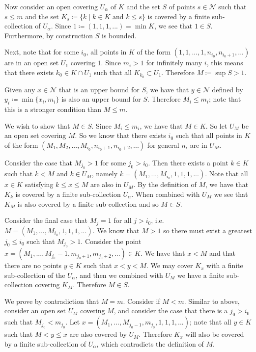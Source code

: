 Now consider an open covering \(U_\alpha\) of \(K\) and the set \(S\) of points \(s \in \mathcal N\) such
that \(s \leq m\) and the set \(K_s \coloneqq \{k \mid k \in K \text{ and } k \leq s\}\) is covered by a
finite sub-collection of \(U_\alpha\). Since \(1 \coloneqq (1, 1, 1, ...) = \min K\), we see that \(1 \in S\).
Furthermore, by construction \(S\) is bounded. 

Next, note that for some \(i_0\), all points in \(K\) of the form \((1, 1, ..., 1, n_{i_0}, n_{i_0 + 1}, ...)\)
are in an open set \(U_1\) covering \(1\). Since \(m_i > 1\) for infinitely many \(i\), this means that there
exists \(k_0 \in K \cap U_1\) such that all \(K_{k_0} \subset U_1\). Therefore \(M \coloneqq \sup S > 1\).

Given any \(x \in \mathcal N\) that is an upper bound for \(S\), we have that \(y \in \mathcal N\) defined by
\(y_i \coloneqq \min \{x_i, m_i\}\) is also an upper bound for \(S\). Therefore \(M_i \leq m_i\); note that
this is a stronger condition than \(M \leq m\). 

We wish to show that \(M \in S\). Since \(M_i \leq m_i\), we have that \(M \in K\). So let \(U_M\) be an
open set covering \(M\). So we know that there exists \(i_0\) such that all
points in \(K\) of the form \((M_1, M_2, ..., M_{i_0}, n_{i_0+1}, n_{i_0 + 2}, ...)\) for
general \(n_i\) are in \(U_M\).  

Consider the case that \(M_{j_0} > 1\) for some \(j_0 > i_0\). Then there exists a point \(k \in K\) such that
\(k < M\) and \(k \in U_M\), namely \(k = (M_1, ..., M_{i_0}, 1, 1, 1, ...)\). Note that all \(x \in K\)
satisfying \(k \leq x \leq M\) are also in \(U_M\). By the definition of \(M\), we
have that \(K_k\) is covered by a finite sub-collection \(U_\alpha\). When combined with \(U_M\)
we see that \(K_M\) is also covered by a finite sub-collection and so \(M \in S\). 

Consider the final case that \(M_j = 1\) for all \(j > i_0\), i.e. \(M = (M_1, ..., M_{i_0}, 1, 1, 1, ...)\).
We know that \(M > 1\) so there must exist a greatest \(j_0 \leq i_0\) such that \(M_{j_0} > 1\). Consider
the point
\(x = (M_1, ..., M_{j_0}-1, m_{j_0 + 1}, m_{j_0 + 2}, ...) \in K\). We have that \(x < M\) and that there are
no points \(y \in K\) such that \(x < y < M\). We may cover \(K_x\) with a finite sub-collection of the
\(U_\alpha\), and then we combined with \(U_M\) we have a finite sub-collection covering \(K_M\). Therefore
\(M \in S\). 

We prove by contradiction that \(M = m\). Consider if \(M < m\). Similar to above, consider an open set
\(U_M\) covering \(M\), and consider the case that there is a \(j_0 > i_0\) such that \(M_{j_0} < m_{j_0}\).
Let \(x = (M_1, ..., M_{j_0 - 1}, m_{j_0}, 1, 1, 1, ...)\); note that all
\(y \in K\) such that \(M < y \leq x\) are also covered by \(U_M\). Therefore \(K_x\) will also be
covered by a finite sub-collection of \(U_\alpha\), which contradicts the definition of \(M\).

